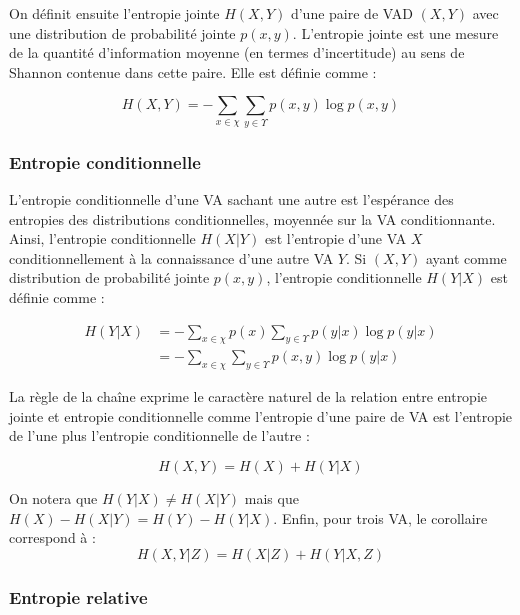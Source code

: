 On définit ensuite l'entropie jointe $H(X,Y)$ d'une paire de VAD $(X,Y)$ avec une distribution de probabilité jointe $p(x,y)$. 
L'entropie jointe est une mesure de la quantité d'information moyenne (en termes d'incertitude) au sens de Shannon contenue dans cette paire. 
Elle est définie comme :

\begin{equation}
H(X,Y) = - \sum_{x \in \chi} \sum_{y \in \Upsilon} {p(x,y) \log p(x,y)}
\end{equation}

\subsubsection{Entropie conditionnelle}
\label{conden}

L'entropie conditionnelle d'une VA sachant une autre est l'espérance des entropies des distributions conditionnelles, moyennée sur la VA conditionnante. 
Ainsi, l'entropie conditionnelle $H(X|Y)$ est l'entropie d'une VA $X$ conditionnellement à la connaissance d'une autre VA $Y$. 
Si $(X,Y)$ ayant comme distribution de probabilité jointe $p(x,y)$, l'entropie conditionnelle $H(Y|X)$ est définie comme :

\begin{align}
H(Y|X) & = - \sum_{x \in \chi}{p(x)} \sum_{y \in \Upsilon} {p(y|x) \log p(y|x)} \\
& = - \sum_{x \in \chi} \sum_{y \in \Upsilon} {p(x,y) \log p(y|x)}
\end{align}

La règle de la chaîne exprime le caractère naturel de la relation entre entropie jointe et entropie conditionnelle comme l'entropie d'une paire de VA est l'entropie de l'une plus l'entropie conditionnelle de l'autre \citep{cover2006} :

\begin{equation}
H(X,Y) = H(X) + H(Y|X)
\end{equation}

On notera que $H(Y|X) \neq H(X|Y)$ mais que $H(X)-H(X|Y)=H(Y)-H(Y|X)$. 
Enfin, pour trois VA, le corollaire correspond à :
\begin{equation}
H(X,Y|Z) = H(X|Z) + H(Y|X,Z)
\end{equation}

\subsubsection{Entropie relative}
\label{dkl}

